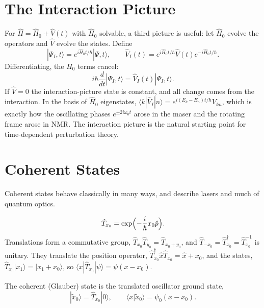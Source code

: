 \section{The Interaction Picture}

For $\hat{H} = \hat{H}_0 + \hat{V}(t)$ with $\hat{H}_0$ solvable, a third picture is useful: let $\hat{H}_0$ evolve the operators and $\hat{V}$ evolve the states. Define
\[
    |\Psi_I,t\rangle = e^{i\hat{H}_0t/\hbar}|\Psi,t\rangle,
    \qquad
    \hat{V}_I(t) = e^{i\hat{H}_0t/\hbar}\hat{V}(t)e^{-i\hat{H}_0t/\hbar}.
\]
Differentiating, the $\hat{H}_0$ terms cancel:
\[
    i\hbar\frac{d}{dt}|\Psi_I,t\rangle = \hat{V}_I(t)|\Psi_I,t\rangle .
\]
If $\hat{V} = 0$ the interaction-picture state is constant, and all change comes from the interaction. In the basis of $\hat{H}_0$ eigenstates, $\langle k|\hat{V}_I|n\rangle = e^{i(E_k-E_n)t/\hbar}V_{kn}$, which is exactly how the oscillating phases $e^{\pm2i\omega_0t}$ arose in the maser and the rotating frame arose in NMR. The interaction picture is the natural starting point for time-dependent perturbation theory.

\section{Coherent States}

Coherent states behave classically in many ways, and describe lasers and much of quantum optics.

\begin{definition}
\[
    \hat{T}_{x_0} = \exp\Bigl(-\frac{i}{\hbar}x_0\hat{p}\Bigr).
\]
Translations form a commutative group, $\hat{T}_{x_0}\hat{T}_{y_0} = \hat{T}_{x_0+y_0}$, and $\hat{T}_{-x_0} = \hat{T}_{x_0}^\dagger = \hat{T}_{x_0}^{-1}$ is unitary. They translate the position operator, $\hat{T}_{x_0}^\dagger\hat{x}\hat{T}_{x_0} = \hat{x} + x_0$, and the states, $\hat{T}_{x_0}|x_1\rangle = |x_1+x_0\rangle$, so $\langle x|\hat{T}_{x_0}|\psi\rangle = \psi(x-x_0)$.
\end{definition}

\begin{definition}
The coherent (Glauber) state is the translated oscillator ground state,
\[
    |\tilde{x}_0\rangle = \hat{T}_{x_0}|0\rangle,
    \qquad
    \langle x|\tilde{x}_0\rangle = \psi_0(x-x_0).
\]
\end{definition}

